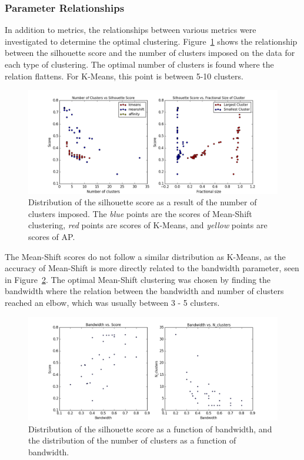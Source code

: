 \subsubsection{Parameter Relationships}
In addition to metrics, the relationships between various metrics were investigated to determine the optimal clustering.
Figure~\ref{fig:sscore} shows the relationship between the silhouette score and the number of clusters imposed on the data for each type of clustering. 
The optimal number of clusters is found where the relation flattens.
For K-Means, this point is between 5-10 clusters.

\begin{figure}[H]
\centering
\includegraphics[width=\linewidth]{figs/silhouette_score_relation}
\caption{Distribution of the silhouette score as a result of the number of clusters imposed. The \textit{blue} points are the scores of Mean-Shift clustering, \textit{red} points are scores of K-Means, and \textit{yellow} points are scores of AP.}
\label{fig:sscore}
\end{figure}

The Mean-Shift scores do not follow a similar distribution as K-Means, as the accuracy of Mean-Shift is more directly related to the bandwidth parameter, seen in Figure~\ref{fig:bwscore}.
The optimal Mean-Shift clustering was chosen by finding the bandwidth where the relation between the bandwidth and number of clusters reached an elbow, which was usually between 3 - 5 clusters.

\begin{figure}[H]
\centering
\includegraphics[width=\linewidth]{figs/meanshift_parameters}
\caption{Distribution of the silhouette score as a function of bandwidth, and the distribution of the number of clusters as a function of bandwidth.}
\label{fig:bwscore}
\end{figure}
